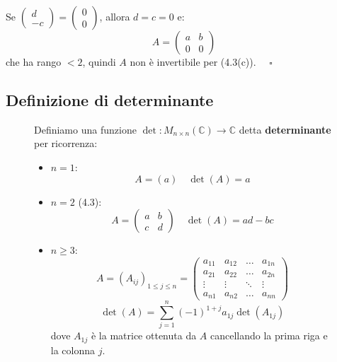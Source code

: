 \documentclass[a4paper]{article}
\theoremstyle{break}
\theoremstyle{break}
\theoremstyle{break}
\theoremstyle{break}
\begin{document}
\vspace{1em}
\noindent Se \( \begin{pmatrix} d\\-c \end{pmatrix} = \begin{pmatrix} 0\\0 \end{pmatrix}  \),
allora \( d = c = 0 \) e:
\[
A = \begin{pmatrix} 
  a & b\\
  0 & 0
\end{pmatrix} 
\] 
che ha rango \( <2 \), quindi \( A \) non è invertibile per (4.3(c)). \( \quad \square \) 

\subsection{Definizione di determinante}
\begin{figure}[H]
  \begin{definition}
    Definiamo una funzione \( \det : M_{n \times n}(\mathbb{C}) \to \mathbb{C} \) detta
    \textbf{determinante} per ricorrenza:
    \begin{itemize}
      \item \( n = 1 \):
        \[
        A = (a) \quad \det(A) = a
        \] 
      \item \( n = 2 \) (4.3):
        \[
        A = \begin{pmatrix} 
          a & b\\
          c & d
        \end{pmatrix} 
        \quad \det(A) = ad-bc
        \]
      \item \( n \ge 3 \):
        \[
          A = (A_{ij})_{1 \le j \le n}= \begin{pmatrix} 
          a_{11} & a_{12} & \ldots & a_{1n}\\
          a_{21} & a_{22} & \ldots & a_{2n}\\
          \vdots & \vdots & \ddots & \vdots\\
          a_{n1} & a_{n2} & \ldots & a_{nn}
        \end{pmatrix} 
        \]
        \[
        \det(A) = \sum_{j=1}^{n}(-1)^{1+j}a_{1j}\det(A_{1j})
        \]
        dove \( A_{1j} \) è la matrice ottenuta da \( A \) cancellando la prima riga e la
        colonna \( j \).
    \end{itemize}
  \end{definition}
\end{figure}
\end{document}
